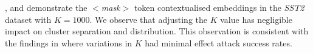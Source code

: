 ,  and  demonstrate the $<$\textit{mask}$>$ token contextualised embeddings in the \textit{SST2} dataset with $K = 1000$. We observe that adjusting the $K$ value has negligible impact on cluster separation and distribution. This observation is consistent with the findings in  where variations in $K$ had minimal effect attack success rates.

